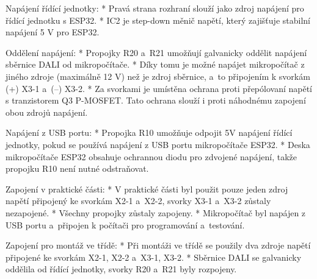 \noindent
{\sbf Napájení řídící jednotky:}
\begitems
    * Pravá strana rozhraní slouží jako zdroj napájení pro řídící jednotku s ESP32.
    * IC2 je step-down měnič napětí, který zajišťuje stabilní napájení 5 V pro ESP32.
\enditems

\noindent
{\sbf Oddělení napájení:}
\begitems
    * Propojky R20 a~R21 umožňují galvanicky oddělit napájení sběrnice DALI od mikropočítače.
    * Díky tomu je možné napájet mikropočítač z jiného zdroje (maximálně 12 V) než je zdroj sběrnice,
     a~to připojením k svorkám (+) X3-1 a~(--) X3-2.
    * Za svorkami je umístěna ochrana proti přepólovaní napětí s tranzistorem Q3 P-MOSFET.
    Tato ochrana slouží i proti náhodnému zapojení obou zdrojů napájení.
\enditems

\noindent
{\sbf Napájení z USB portu:}
\begitems
    * Propojka R10 umožňuje odpojit 5V napájení řídící jednotky, pokud se používá napájení z USB portu mikropočítače ESP32.
    * Deska mikropočítače ESP32 obsahuje ochrannou diodu pro zdvojené napájení, takže propojku R10 není nutné odstraňovat.
\enditems

\noindent
{\sbf Zapojení v praktické části:}
\begitems
    * V praktické části byl použit pouze jeden zdroj napětí připojený ke svorkám X2-1 a~X2-2,
      svorky {X3-1} a~{X3-2} zůstaly nezapojené.
    * Všechny propojky zůstaly zapojeny.
    * Mikropočítač byl napájen z USB portu a~připojen k počítači pro programování a~testování.
\enditems


\noindent
{\sbf Zapojení pro montáž ve třídě:}
\begitems
    * Při montáži ve třídě se použily dva zdroje napětí připojené ke svorkám X2-1, X2-2 a~{X3-1}, {X3-2}.
    * Sběrnice DALI se galvanicky oddělila od řídící jednotky, svorky R20 a~R21 byly rozpojeny.
\enditems







